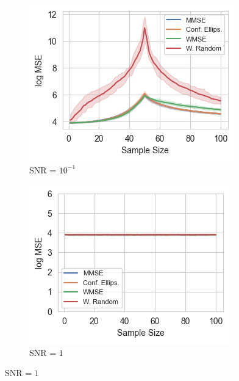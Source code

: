 \begin{figure}%
    \centering
    \begin{subfigure}{0.3\columnwidth}
    \includegraphics[width=\columnwidth]{figures/proj1/LS_MSE_bl_old/SBM_500_bandwidth_50_SNRdbs_-10.0_samps_100_MSE_LS.png}
    \caption{SNR = $10^{-1}$}
    \label{bandlimited_SBM_MSE_subfiga}
    \end{subfigure}\hfill
    \begin{subfigure}{0.3\columnwidth}
    \includegraphics[width=\columnwidth]{figures/proj1/plots/LS_MSE/SBM_500_bandwidth_50_SNRdbs_0.0_samps_100_bl_MSE_LS.png}
    \caption{SNR = $1$}%
    \label{bandlimited_SBM_MSE_subfigb}%

\end{subfigure}
\end{figure}
